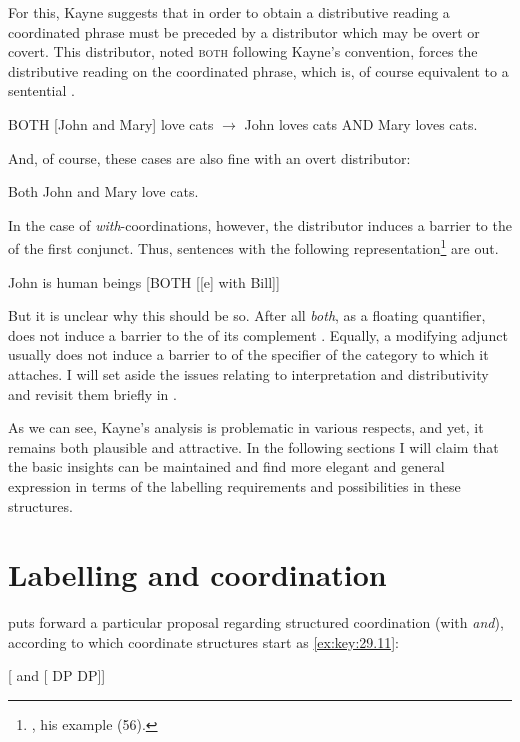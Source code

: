 \documentclass[output=paper]{langsci/langscibook}
\begin{document}
\label{sfrenchs}
\z

 For this, Kayne suggests that in order to obtain a distributive reading a coordinated phrase must be preceded by a distributor which may be overt or covert. This distributor, noted \textsc{both} following Kayne's convention, forces the distributive reading on the coordinated phrase, which is, of course equivalent to a sentential .

 \ea\label{ex:key:29.8}
    BOTH [John and Mary] love cats $\rightarrow$ John loves cats AND Mary loves cats.
\z

 And, of course, these cases are also fine with an overt distributor:

\ea\label{ex:key:29.9}
    Both John and Mary love cats.
\z

In the case of \emph{with}-coordinations, however, the distributor induces a
barrier to the  of the first conjunct. Thus, sentences with the
following representation\footnote{\citet[66]{Kayne1994}, his example (56).} are
out.

\ea\label{kex}
    John is human beings [BOTH [[e] with Bill]]
\z

But it is unclear why this should be so. After all \emph{both}, as a floating
quantifier, does not induce a barrier to the  of its complement
\citep[cf.][]{sportiche:88}. Equally, a modifying adjunct usually does not
induce a barrier to  of the specifier of the category to which it
attaches. I will set aside the issues relating to interpretation and
distributivity and revisit them briefly in .

As we can see, Kayne's analysis is problematic in various respects, and yet, it
remains both plausible and attractive. In the following sections I will claim
that the basic insights can be maintained and find more elegant and general
expression in terms of the labelling requirements and possibilities in these
structures.

\section{Labelling and coordination} \label{laco}

\citet{Chomsky2013} puts forward a particular proposal regarding structured
coordination (with \emph{and}), according to which coordinate structures start
as \eqref{ex:key:29.11}:

\ea\label{ex:key:29.11}
    {}[ and [ DP DP]]
\z
\end{document}
